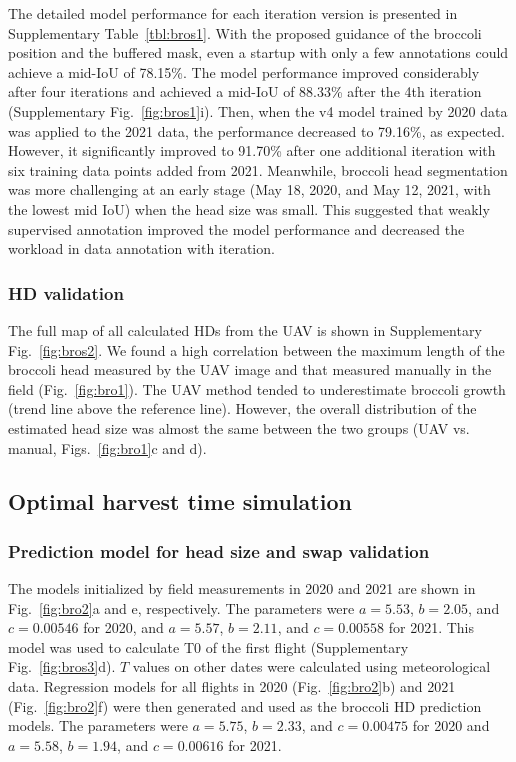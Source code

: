 The detailed model performance for each iteration version is presented in Supplementary Table~\ref{tbl:bros1}. With the proposed guidance of the broccoli position and the buffered mask, even a startup with only a few annotations could achieve a mid-IoU of 78.15\%. The model performance improved considerably after four iterations and achieved a mid-IoU of 88.33\% after the 4th iteration (Supplementary Fig.~\ref{fig:bros1}i). Then, when the v4 model trained by 2020 data was applied to the 2021 data, the performance decreased to 79.16\%, as expected. However, it significantly improved to 91.70\% after one additional iteration with six training data points added from 2021. Meanwhile, broccoli head segmentation was more challenging at an early stage (May 18, 2020, and May 12, 2021, with the lowest mid IoU) when the head size was small. This suggested that weakly supervised annotation improved the model performance and decreased the workload in data annotation with iteration.

\subsubsection*{HD validation}

The full map of all calculated HDs from the UAV is shown in Supplementary Fig.~\ref{fig:bros2}. We found a high correlation between the maximum length of the broccoli head measured by the UAV image and that measured manually in the field (Fig.~\ref{fig:bro1}). The UAV method tended to underestimate broccoli growth (trend line above the reference line). However, the overall distribution of the estimated head size was almost the same between the two groups (UAV vs. manual, Figs.~\ref{fig:bro1}c and d). 




\subsection{Optimal harvest time simulation}

\subsubsection*{Prediction model for head size and swap validation}

The models initialized by field measurements in 2020 and 2021 are shown in Fig.~\ref{fig:bro2}a and e, respectively. The parameters were $a = 5.53$, $b = 2.05$, and $c = 0.00546$ for 2020, and $a = 5.57$, $b = 2.11$, and $c = 0.00558$ for 2021. This model was used to calculate T0 of the first flight (Supplementary Fig.~\ref{fig:bros3}d). $T$ values on other dates were calculated using meteorological data. Regression models for all flights in 2020 (Fig.~\ref{fig:bro2}b) and 2021 (Fig.~\ref{fig:bro2}f) were then generated and used as the broccoli HD prediction models. The parameters were $a = 5.75$, $b = 2.33$, and $c = 0.00475$ for 2020 and $a = 5.58$, $b = 1.94$, and $c = 0.00616$ for 2021.

